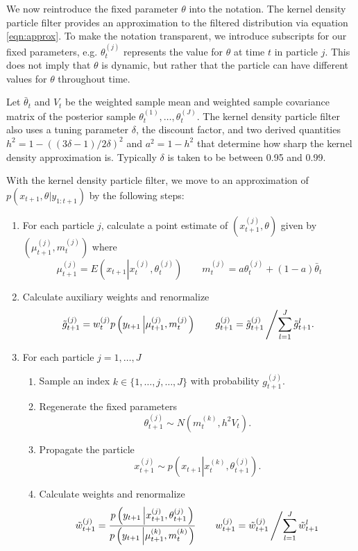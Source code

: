 \documentclass{article}
\begin{document}
We now reintroduce the fixed parameter $\theta$ into the notation. The kernel density particle filter provides an approximation to the filtered distribution via equation \eqref{eqn:approx}. To make the notation transparent, we introduce subscripts for our fixed parameters, e.g. $\theta_t^{(j)}$ represents the value for $\theta$ at time $t$ in particle $j$. This does not imply that $\theta$ is dynamic, but rather that the particle can have different values for $\theta$ throughout time.

Let $\bar{\theta}_t$ and $V_t$ be the weighted sample mean and weighted sample covariance matrix of the posterior sample $\theta_t^{(1)},\ldots,\theta_t^{(J)}$.  The kernel density particle filter also uses a tuning parameter $\delta$, the discount factor, and two derived quantities $h^2 = 1 - ((3\delta - 1)/2\delta)^2$ and $a^2 = 1 - h^2$ that determine how sharp the kernel density approximation is. Typically $\delta$ is taken to be between 0.95 and 0.99.

With the kernel density particle filter, we move to an approximation of $p(x_{t+1},\theta|y_{1:t+1})$ by the following steps:

\begin{enumerate}
\item For each particle $j$, calculate a point estimate of $\left(x_{t+1}^{(j)},\theta\right)$ given by $\left(\mu_{t+1}^{(j)},m_t^{(j)}\right)$ where
    \[
    \mu_{t+1}^{(j)} = E\left(x_{t+1}\left|x_t^{(j)},\theta_t^{(j)} \right.\right) \qquad
    m_t^{(j)} = a\theta_t^{(j)} + (1-a)\bar{\theta}_t
    \]
\item Calculate auxiliary weights and renormalize
\[ \tilde{g}_{t+1}^{(j)} = w_t^{(j)} p\left(y_{t+1}\left|\mu_{t+1}^{(j)},m_t^{(j)}\right.\right) \qquad g_{t+1}^{(j)} = \tilde{g}_{t+1}^{(j)}\left/ \sum_{l=1}^J \tilde{g}_{t+1}^l. \right. \]
\item For each particle $j=1,\ldots,J$
	\begin{enumerate}
	\item Sample an index $k\in\{1,\ldots,j,\ldots,J\}$ with probability $g_{t+1}^{(j)}$.
	\item Regenerate the fixed parameters
	\[ \theta_{t+1}^{(j)} \sim N\left( m_t^{(k)}, h^2V_t \right). \]
	\item Propagate the particle
	\[ x_{t+1}^{(j)} \sim p\left(x_{t+1}\left|x_t^{(k)},\theta_{t+1}^{(j)}\right.\right). \]
	\item Calculate weights and renormalize
	\[\tilde{w}_{t+1}^{(j)} = \frac{p\left(y_{t+1}\left|x_{t+1}^{(j)},\theta_{t+1}^{(j)}\right.\right)}{p\left(y_{t+1}\left|\mu_{t+1}^{(k)},m_t^{(k)}\right.\right)}
	\qquad
	w_{t+1}^{(j)} = \tilde{w}_{t+1}^{(j)}\left/\sum_{l=1}^J \tilde{w}_{t+1}^l \right.\]
	\end{enumerate}
\end{enumerate}
\end{document}
